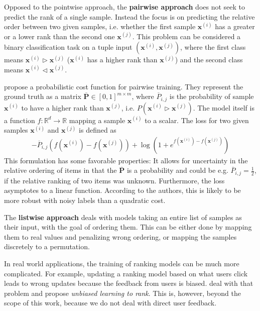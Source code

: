 Opposed to the pointwise approach, the \textbf{pairwise approach} does not seek to predict the rank of a single sample. Instead the focus is on predicting the relative order between two given samples, i.e. whether the first sample $\bm{x}^{(i)}$ has a greater or a lower rank than the second one $\bm{x}^{(j)}$. This problem can be considered a binary classification task on a tuple input $(\bm{x}^{(i)},\bm{x}^{(j)})$, where the first class means $\bm{x}^{(i)}\triangleright \bm{x}^{(j)}$ ($\bm{x}^{(i)}$ has a higher rank than $\bm{x}^{(j)}$) and the second class means $\bm{x}^{(i)}\triangleleft \bm{x}^{(j)}$.

\cite{Burges:learningtorankwithsgd} propose a probabilistic cost function for pairwise training. 
They represent the ground truth as a matrix $\bm{\overline{P}}\in[0,1]^{m\times m}$, where $\overline{P}_{i,j}$ is the probability of sample $\bm{x}^{(i)}$ to have a higher rank than $\bm{x}^{(j)}$, i.e. $P(\bm{x}^{(i)}\triangleright \bm{x}^{(j)})$. 
The model itself is a function $f:\mathbb{R}^d\rightarrow\mathbb{R}$ mapping a sample $\bm{x}^{(i)}$ to a scalar. The loss for two given samples $\bm{x}^{(i)}$ and $\bm{x}^{(j)}$ is defined as
\begin{align}
-\overline{P}_{i,j}\left(f\left(\bm{x}^{(i)}\right)-f\left(\bm{x}^{(j)}\right)\right)+\log\left(1+e^{f\left(\bm{x}^{(i)}\right)-f\left(\bm{x}^{(j)}\right)}\right)
\end{align}
This formulation has some favorable properties: It allows for uncertainty in the relative ordering of items in that the $\bm{\overline{P}}$ is a probability and could be e.g. $\overline{P}_{i,j}=\frac{1}{2}$, if the relative ranking of two items was unknown. Furthermore, the loss asymptotes to a linear function. According to the authors, this is likely to be more robust with noisy labels than a quadratic cost.

The \textbf{listwise approach} deals with models taking an entire list of samples as their input, with the goal of ordering them. This can be either done by mapping them to real values and penalizing wrong ordering, or mapping the samples discretely to a permutation.

In real world applications, the training of ranking models can be much more complicated. For example, updating a ranking model based on what users click leads to wrong updates because the feedback from users is biased. \cite{unbiasedlearningtorank} deal with that problem and propose \textit{unbiased learning to rank}. This is, however, beyond the scope of this work, because we do not deal with direct user feedback.

